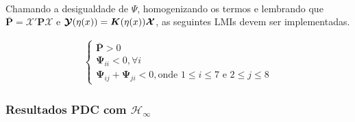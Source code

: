 \documentclass[a4paper,10pt]{article}
\begin{document}
\paragraph{}Chamando a desigualdade de $\Psi$, homogenizando os termos e lembrando que $\bar{\bm{P}} = \bm{\mathcal{X}}'\bm{P}\bm{\mathcal{X}}$ e $\bm{\mathcal{Y}}(\eta(x)) = \bm{K}(\eta(x))\bm{\mathcal{X}}$, as seguintes LMIs devem ser implementadas.

\begin{gather}
	\begin{cases}
		\bar{\bm{P}} > 0 \\
		\bm{\Psi}_{ii} < 0, \forall{i} \\
		\bm{\Psi}_{ij} + \bm{\Psi}_{ji} < 0, \text{onde $1 \leq i  \leq 7$ e $2 \leq j  \leq 8$} 
	\end{cases}
\end{gather}
\subsubsection{Resultados PDC com $\mathcal{H}_{\infty}$}
\end{document}
